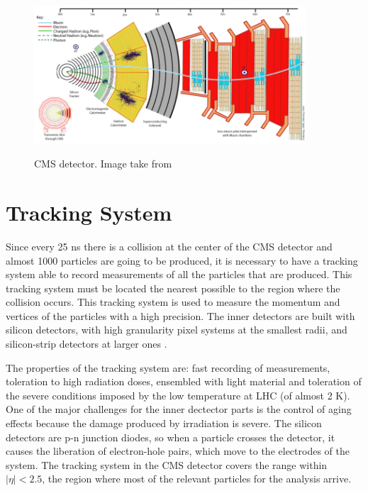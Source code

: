 
 \begin{figure}[h]
 \centering
 \caption{CMS detector. Image take from \cite{CMS_detector_slice}}
 \includegraphics[width=0.9\textwidth]{./Capitulos/CMS/CMS}  
 \label{CMS_detector}
 \end{figure}

\section{Tracking System}

Since every 25 ns there is a collision at the center of the CMS detector and almost 1000 particles are going to be produced, it is necessary to have a tracking system able to record measurements 
of all the particles that are produced. This tracking system must be located the nearest possible to the region where the collision occurs. This tracking system is used to measure the momentum and 
vertices of the particles with a high precision. The inner detectors are built with silicon detectors, with high granularity pixel systems at the smallest radii, and silicon-strip detectors at larger ones \cite{Perspectives_LHC}.

The properties of the tracking system are: fast recording of measurements, toleration to high radiation doses, ensembled with light material and toleration of the severe conditions imposed by the low temperature at LHC (of almost 2 K). One of the major challenges for the inner dectector parts is the control of aging effects because the damage produced by irradiation is severe. The silicon detectors are p-n junction diodes, so when a particle crosses the detector, it causes the liberation of electron-hole pairs, which move to the electrodes of the system. The tracking system in the CMS detector covers the range within $|\eta|<2.5$, the region where most of the relevant particles for the analysis arrive. 

